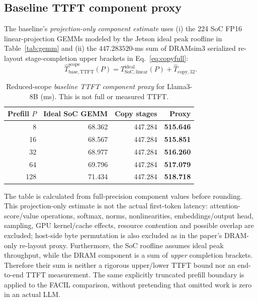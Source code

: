 \documentclass[conference,10pt]{IEEEtran}
\begin{document}
\subsection{Baseline TTFT component proxy}
The baseline's \emph{projection-only component estimate} uses
(i) the 224 SoC FP16
linear-projection GEMMs modeled by the Jetson ideal peak roofline in
Table~\ref{tab:gemm} and (ii) the $447.283520$-ms sum of DRAMsim3
serialized re-layout stage-completion upper brackets in
Eq.~\eqref{eq:copyfull}:
\begin{equation}
\widehat T^{\mathrm{scope}}_{\mathrm{base,TTFT}}(P)
= T^{\mathrm{ideal}}_{\mathrm{SoC,linear}}(P)
 + \widehat T_{\mathrm{copy,32}}.
\label{eq:combined_base}
\end{equation}
\begin{table}[t]
\caption{Reduced-scope \emph{baseline TTFT component proxy}
for Llama3-8B (ms). This is not full or measured TTFT.}
\label{tab:combined_base}
\centering\footnotesize
\begin{tabular}{@{}rrrr@{}}
\toprule
Prefill $P$ & Ideal SoC GEMM & Copy stages & Proxy \\
\midrule
8 & 68.362 & 447.284 & \textbf{515.646} \\
16 & 68.567 & 447.284 & \textbf{515.851} \\
32 & 68.977 & 447.284 & \textbf{516.260} \\
64 & 69.796 & 447.284 & \textbf{517.079} \\
128 & 71.434 & 447.284 & \textbf{518.718} \\
\bottomrule
\end{tabular}
\end{table}
The table is calculated from full-precision component values before
rounding. This projection-only estimate is not the actual first-token
latency: attention-score/value operations, softmax, norms, nonlinearities,
embeddings/output head, sampling, GPU kernel/cache effects,
resource contention and possible overlap are excluded; host-side
byte permutation is also excluded as in the paper's DRAM-only
re-layout proxy. Furthermore, the SoC roofline assumes ideal
peak throughput, while the DRAM component is a sum of \emph{upper}
completion brackets. Therefore their sum is neither a rigorous
upper/lower TTFT bound nor an end-to-end TTFT measurement. The same explicitly truncated prefill boundary is applied to the
FACIL comparison, without pretending that omitted work is zero
in an actual LLM.
\end{document}
